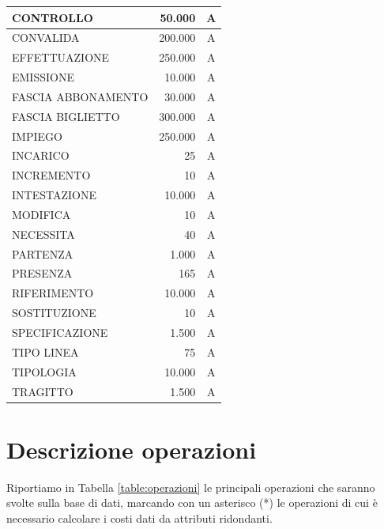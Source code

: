 \documentclass[12pt,a4paper]{report}
\begin{document}
\begin{longtable}{|p{7.5cm}|r|c|}
\hline
CONTROLLO & 50.000 & A \\
\hline
CONVALIDA & 200.000 & A \\
\hline
EFFETTUAZIONE & 250.000 & A \\
\hline
EMISSIONE & 10.000 & A \\
\hline
FASCIA ABBONAMENTO & 30.000 & A \\
\hline
FASCIA BIGLIETTO & 300.000 & A \\
\hline
IMPIEGO & 250.000 & A \\
\hline
INCARICO & 25 & A \\
\hline
INCREMENTO & 10 & A \\
\hline
INTESTAZIONE & 10.000 & A \\
\hline
MODIFICA & 10 & A \\
\hline
NECESSITA & 40 & A \\
\hline
PARTENZA & 1.000 & A \\
\hline
PRESENZA & 165 & A \\
\hline
RIFERIMENTO & 10.000 & A \\
\hline
SOSTITUZIONE & 10 & A \\
\hline
SPECIFICAZIONE & 1.500 & A \\
\hline
TIPO LINEA & 75 & A \\
\hline
TIPOLOGIA & 10.000 & A \\
\hline
TRAGITTO & 1.500 & A \\
\hline
\end{longtable}


\section{Descrizione operazioni}
Riportiamo in Tabella \ref{table:operazioni} le principali operazioni che saranno svolte sulla base di dati, marcando con un asterisco (*) le operazioni di cui è necessario calcolare i costi dati da attributi ridondanti.
\end{document}
